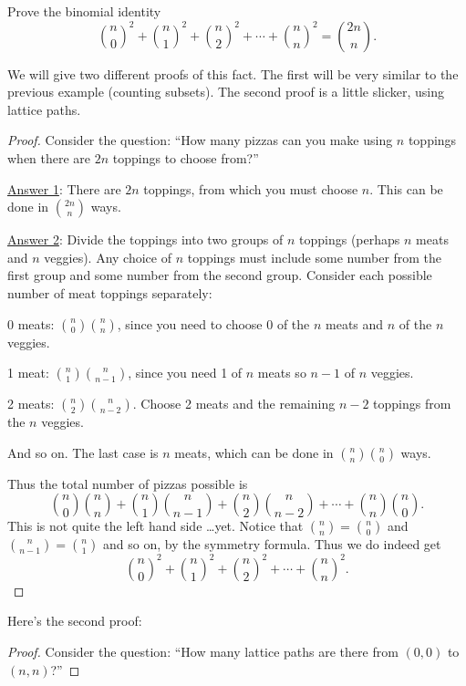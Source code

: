 \documentclass[12pt]{article}
\begin{document}
\begin{example}
  Prove the binomial identity
  \[{n \choose 0}^2 + {n \choose 1}^2 + {n \choose 2}^2 + \cdots + {n \choose n}^2 = {2n \choose n}.\]
  \begin{solution}
    We will give two different proofs of this fact.  The first will be very similar to the previous example (counting subsets).  The second proof is a little slicker, using lattice paths.
    
    \begin{proof}
      Consider the question: ``How many pizzas can you make using $n$ toppings when there are $2n$ toppings to choose from?''
      
      \underline{Answer 1}:  There are $2n$ toppings, from which you must choose $n$.  This can be done in ${2n \choose n}$ ways.
      
      \underline{Answer 2}: Divide the toppings into two groups of $n$ toppings (perhaps $n$ meats and $n$ veggies).  Any choice of $n$ toppings must include some number from the first group and some number from the second group.  Consider each possible number of meat toppings separately:
      
      0 meats: ${n \choose 0}{n \choose n}$, since you need to choose 0 of the $n$ meats and $n$ of the $n$ veggies.
      
      1 meat: ${n \choose 1}{n \choose n-1}$, since you need 1 of $n$ meats so $n-1$ of $n$ veggies.
      
      2 meats: ${n \choose 2}{n \choose n-2}$.  Choose 2 meats and the remaining $n-2$ toppings from the $n$ veggies.
      
      And so on.  The last case is $n$ meats, which can be done in ${n \choose n}{n \choose 0}$ ways.
      
      Thus the total number of pizzas possible is
      \[{n \choose 0}{n \choose n} + {n \choose 1}{n \choose n-1} + {n \choose 2}{n \choose n-2} + \cdots + {n \choose n}{n \choose 0}.\]
      This is not quite the left hand side \ldots yet.  Notice that ${n \choose n} = {n \choose 0}$ and ${n \choose n-1} = {n  \choose 1}$ and so on, by the symmetry formula.  Thus we do indeed get
      \[{n \choose 0}^2 + {n \choose 1}^2 + {n \choose 2}^2 + \cdots + {n \choose n}^2.\]      
    \end{proof}
    
    Here's the second proof:
    
    \begin{proof}
      Consider the question: ``How many lattice paths are there from $(0,0)$ to $(n,n)$?''
      

\end{proof}
\end{solution}
\end{example}
\end{document}
